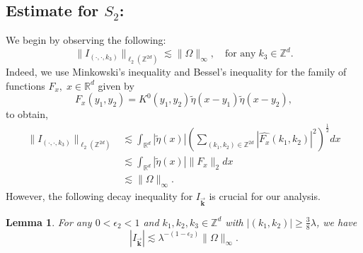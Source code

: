 \documentclass[a4paper,reqno]{amsart}
\newcommand{\R}{{\mathbb R}}       %
\newcommand{\Z}{{\mathbb Z}}
\newtheorem{lemma}[theorem]{Lemma}
\theoremstyle{definition}
\numberwithin{equation}{section}
\begin{document}
\subsection*{Estimate for $S_2$:} We begin by observing the following:
\begin{equation}\label{est:ell2}
	\|I_{(\cdot,\cdot,k_3)}\|_{\ell_2(\Z^{2d})}\lesssim\|\Omega\|_\infty,\quad\text{for any}\;k_3\in\Z^d.
\end{equation}
Indeed, we use Minkowski's inequality and  Bessel's inequality for the family of functions $F_x,\;x\in\R^d$ given by 
\[F_x(y_1,y_2)=K^0(y_1,y_2)\widetilde{\eta}(x-y_1)\widetilde{\eta}(x-y_2),\]
to obtain,
\begin{align*}
	\|I_{(\cdot,\cdot,k_3)}\|_{\ell_2(\Z^{2d})}&\lesssim\int_{\R^d}|\widetilde{\eta}(x)|\left(\sum_{(k_1,k_2)\in\Z^{2d}}|\widehat{F_x}(k_1,k_2)|^2\right)^\frac{1}{2}dx\\
	&\lesssim\int_{\R^d}|\widetilde{\eta}(x)|\|F_x\|_2dx\\
	&\lesssim\|\Omega\|_\infty.
\end{align*}
However, the following decay inequality for $I_{\vec{\mathbf{k}}}$ is crucial for our analysis.
\begin{lemma}\label{lemma:ellinfty}
	For any $0<\epsilon_2<1$ and $k_1,k_2,k_3\in\Z^d$ with $|(k_1,k_2)|\geq\frac{3}{8}\lambda$, we have
	\[|I_{\vec{\mathbf{k}}}|\lesssim\lambda^{-(1-\epsilon_2)}\|\Omega\|_\infty.\]
\end{lemma}
\end{document}
